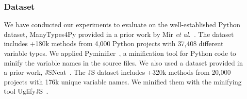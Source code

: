 

\subsubsection*{Dataset} We have conducted our experiments to evaluate {\tool} on the
well-established Python dataset, ManyTypes4Py provided in a prior work
by Mir {\em et al.}~\cite{mir2021manytypes4py}. The dataset includes
+180k methods from 4,000 Python projects with 37,408 different
variable types. We applied Pyminifier~\cite{pyminifier}, a
minification tool for Python code to minify the variable names in the
source files.
We also used a dataset provided in a prior work,
JSNeat~\cite{icse19}. The JS dataset includes +320k methods from
20,000 projects with 176k unique variable names. We minified them with
the minifying tool UglifyJS~\cite{uglify}.

